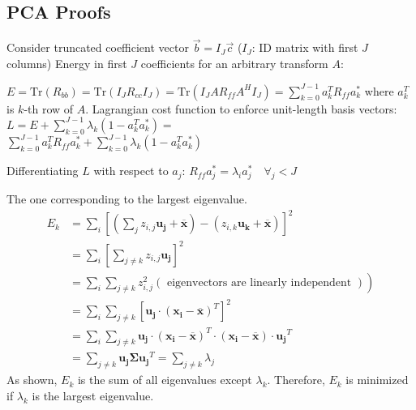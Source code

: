 \subsection{PCA Proofs}

\begin{definition}
  Consider truncated coefficient vector \(\vec{b} = I_J \vec{c}\) {\color{gray}(\(I_J\): ID matrix with first \(J\) columns)} Energy in first \(J\) coefficients for an arbitrary transform \(A\):

  \(E = \text{Tr}(R_{bb}) = \text{Tr}(I_J R_{cc} I_{J}) = \text{Tr}(I_J A R_{ff} A^H I_J) = \sum_{k = 0}^{J - 1} a_k^T R_{ff} a_k^*\) where \(a_k^T\) is \(k\)-th row of \(A\).
  Lagrangian cost function to enforce unit-length basis vectors:
  \(L = E + \sum_{k = 0}^{J - 1} \lambda_k (1 - a_k^T a_k^*) =\) \\
  \( \sum_{k = 0}^{J - 1} a_k^T R_{ff} a_k^* + \sum_{k = 0}^{J - 1} \lambda_k (1 - a_k^T a_k^*)\)

  Differentiating \(L\) with respect to \(a_j\): \(R_{ff} a_j^* = \lambda_i a_j^* \quad \forall_j < J\) {\color{gray}{necessary condition}}
\end{definition}

\pagebreak

\begin{definition}
  The one corresponding to the largest eigenvalue.
  \[
  \begin{aligned}
  E_k & =\sum_i\left[\left(\sum_j z_{i, j} \boldsymbol{u}_{\boldsymbol{j}}+\overline{\boldsymbol{x}}\right)-\left(z_{i, k} \boldsymbol{u}_{\boldsymbol{k}}+\overline{\boldsymbol{x}}\right)\right]^2 \\
  & =\sum_i\left[\sum_{j \neq k} z_{i, j} \boldsymbol{u}_{\boldsymbol{j}}\right]^2 \\
  & \left.=\sum_i \sum_{j \neq k} z_{i, j}^2(\text { eigenvectors are linearly independent })\right) \\
  & =\sum_i \sum_{j \neq k}\left[\boldsymbol{u}_{\boldsymbol{j}} \cdot\left(\boldsymbol{x}_{\boldsymbol{i}}-\overline{\boldsymbol{x}}\right)^T\right]^2 \\
  & =\sum_i \sum_{j \neq k} \boldsymbol{u}_{\boldsymbol{j}} \cdot\left(\boldsymbol{x}_{\boldsymbol{i}}-\overline{\boldsymbol{x}}\right)^T \cdot\left(\boldsymbol{x}_{\boldsymbol{i}}-\overline{\boldsymbol{x}}\right) \cdot \boldsymbol{u}_{\boldsymbol{j}}{ }^T \\
  & =\sum_{j \neq k} \boldsymbol{u}_{\boldsymbol{j}} \boldsymbol{\Sigma} \boldsymbol{u}_{\boldsymbol{j}}{ }^T=\sum_{j \neq k} \lambda_j
  \end{aligned}
  \]
  As shown, \(E_k\) is the sum of all eigenvalues except \(\lambda_k\). Therefore, \(E_k\) is minimized if \(\lambda_k\) is the largest eigenvalue.
\end{definition}

